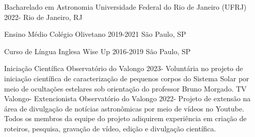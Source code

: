 \documentclass[11pt]{spidercv}
\begin{document}
    





    \begin{MainPart}

    \Experience
        {\ColorHighlight}
		{Bacharelado em Astronomia}
		{Universidade Federal do Rio de Janeiro (UFRJ)}
        {2022-\faUndo}
        {   
            Rio de Janeiro, RJ\\
        
        }
   
    \Experience
        {\ColorHighlight}
		{Ensino Médio}
		{Colégio Olivetano}
        {2019-2021}
        {   
            São Paulo, SP\\

        }

    \Experience
        {\ColorHighlight}
		{Curso de Língua Inglesa}
		{Wise Up}
        {2016-2019}
        {   
            São Paulo, SP\\
        }
        \vspace*{0.7cm}

    \Experience
        {\ColorHighlight}
		{Iniciação Científica}
		{Observatório do Valongo}
        {2023-\faUndo}
        {Voluntária no projeto de iniciação científica de caracterização de pequenos corpos do Sistema Solar por meio de ocultações estelares sob orientação do professor Bruno Morgado.}
        \vspace*{0.1cm}
    \Experience
        {\ColorHighlight}
		{TV Valongo- Extencionista}
		{Observatório do Valongo}
        {2022-\faUndo}
        {Projeto de extensão na área de divulgação de notícias astronômicas por meio de vídeos no Youtube. Todos os membros da equipe do projeto adiquirem experiência em criação de roteiros, pesquisa, gravação de vídeo, edição e divulgação científica.}


\end{MainPart}
\end{document}
